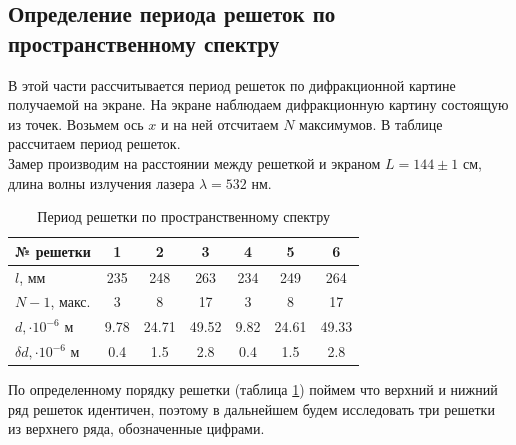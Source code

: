 \documentclass[a4paper, 12pt]{article}%
\begin{document}
	\subsection{Определение периода решеток по пространственному спектру}
	В этой части рассчитывается период решеток по дифракционной картине получаемой на экране. На экране наблюдаем дифракционную картину состоящую из точек. Возьмем ось $x$ и на ней отсчитаем $N$ максимумов. В таблице рассчитаем период решеток.\\
	Замер производим на расстоянии между решеткой и экраном $L = 144\pm1$ см, длина волны излучения лазера $\lambda = 532$ нм.
	\begin{table}[H]
		\centering
		\begin{tabular}{|l|c|c|c|c|c|c|}
			\hline
			№ решетки       & 1    & 2     & 3     & 4    & 5     & 6     \\ \hline
			$l$, мм       & 235  & 248   & 263   & 234  & 249   & 264   \\ \hline
			$N-1$, макс.     & 3    & 8     & 17    & 3    & 8     & 17    \\ \hline
			$d, \cdot 10^{-6}$ м       & 9.78 & 24.71 & 49.52 & 9.82 & 24.61 & 49.33 \\ \hline
			$\delta d, \cdot 10^{-6}$ м & 0.4  & 1.5   & 2.8   & 0.4  & 1.5   & 2.8   \\ \hline
		\end{tabular}
		\caption{Период решетки по пространственному спектру}
		\label{ref:table1}
	\end{table} 
	По определенному порядку решетки (таблица \ref{ref:table1}) поймем что верхний и нижний ряд решеток идентичен, поэтому в дальнейшем будем исследовать три решетки из верхнего ряда, обозначенные цифрами.
\end{document}
